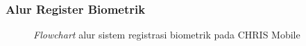 \subsubsection{Alur Register Biometrik}
\begin{figure}[H]
    \centering
    \caption{\textit{Flowchart} alur sistem registrasi biometrik pada CHRIS Mobile}
    \label{fig:flowchart_register_biometrik_chris_mobile}
\end{figure}
